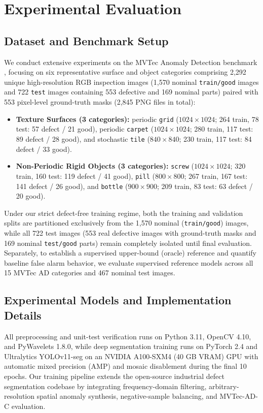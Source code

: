 \section{Experimental Evaluation}
\label{sec:experiments}

\subsection{Dataset and Benchmark Setup}
We conduct extensive experiments on the MVTec Anomaly Detection benchmark \cite{bergmann2019mvtec}, focusing on six representative surface and object categories comprising 2,292 unique high-resolution RGB inspection images (1,570 nominal \texttt{train/good} images and 722 \texttt{test} images containing 553 defective and 169 nominal parts) paired with 553 pixel-level ground-truth masks (2,845 PNG files in total):
\begin{itemize}
    \item \textbf{Texture Surfaces (3 categories):} periodic \texttt{grid} ($1024\times 1024$; 264 train, 78 test: 57 defect / 21 good), periodic \texttt{carpet} ($1024\times 1024$; 280 train, 117 test: 89 defect / 28 good), and stochastic \texttt{tile} ($840\times 840$; 230 train, 117 test: 84 defect / 33 good).
    \item \textbf{Non-Periodic Rigid Objects (3 categories):} \texttt{screw} ($1024\times 1024$; 320 train, 160 test: 119 defect / 41 good), \texttt{pill} ($800\times 800$; 267 train, 167 test: 141 defect / 26 good), and \texttt{bottle} ($900\times 900$; 209 train, 83 test: 63 defect / 20 good).
\end{itemize}
Under our strict defect-free training regime, both the training and validation splits are partitioned exclusively from the 1,570 nominal (\texttt{train/good}) images, while all 722 test images (553 real defective images with ground-truth masks and 169 nominal \texttt{test/good} parts) remain completely isolated until final evaluation. Separately, to establish a supervised upper-bound (oracle) reference and quantify baseline false alarm behavior, we evaluate supervised reference models across all 15 MVTec AD categories and 467 nominal test images.

\subsection{Experimental Models and Implementation Details}
All preprocessing and unit-test verification runs on Python 3.11, OpenCV 4.10, and PyWavelets 1.8.0, while deep segmentation training runs on PyTorch 2.4 and Ultralytics YOLOv11-seg \cite{ultralytics2024yolo11} on an NVIDIA A100-SXM4 (40 GB VRAM) GPU with automatic mixed precision (AMP) and mosaic disablement during the final 10 epochs. Our training pipeline extends the open-source industrial defect segmentation codebase \cite{kudupudi2025industrial} by integrating frequency-domain filtering, arbitrary-resolution spatial anomaly synthesis, negative-sample balancing, and MVTec-AD-C evaluation.


